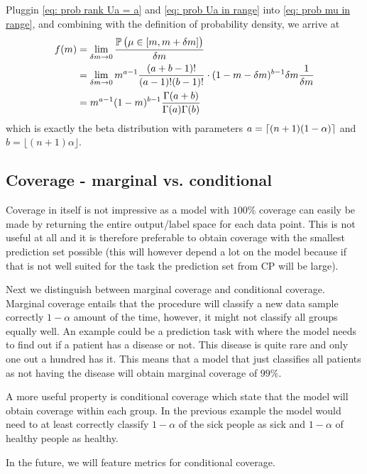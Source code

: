 Pluggin \cref{eq: prob rank Ua = a} and \cref{eq: prob Ua in range} into \cref{eq: prob mu in range}, and combining with the definition of probability density, we arrive at
\begin{align}
    f(m) &= \lim_{\delta m \rightarrow 0} \frac{\operatorname*{\mathbb{P}}\big(\mu\in[m,m+\delta m]\big)}{\delta m}\\
    &= \lim_{\delta m \rightarrow 0} m^{a-1} \frac{(a+b-1)!}{(a-1)!(b-1)!}\cdot (1-m-\delta m)^{b-1}\delta m \frac{1}{\delta m}\\
    &= m^{a-1}(1-m)^{b-1}\frac{\Gamma(a+b)}{\Gamma(a)\Gamma(b)}
\end{align}
which is exactly the beta distribution with parameters $a = \lceil {(n+1)(1-\alpha)} \rceil$ and $b=\lfloor(n+1)\alpha\rfloor$.
%
%
\subsection*{Coverage - marginal vs. conditional}
Coverage in itself is not impressive as a model with $100\%$ coverage can easily be made by returning the entire output/label space for each data point. This is not useful at all and it is therefore preferable to obtain coverage with the smallest prediction set possible (this will however depend a lot on the model because if that is not well suited for the task the prediction set from CP will be large). 

Next we distinguish between marginal coverage and conditional coverage. Marginal coverage entails that the procedure will classify a new data sample correctly $1 - \alpha$ amount of the time, however, it might not classify all groups equally well. An example could be a prediction task with where the model needs to find out if a patient has a disease or not. This disease is quite rare and only one out a hundred has it. This means that a model that just classifies all patients as not having the disease will obtain marginal coverage of $99\%$. 

A more useful property is conditional coverage which state that the model will obtain coverage within each group. In the previous example the model would need to at least correctly classify $1-\alpha$ of the sick people as sick and $1 - \alpha$ of healthy people as healthy.

In the future, we will feature metrics for conditional coverage.